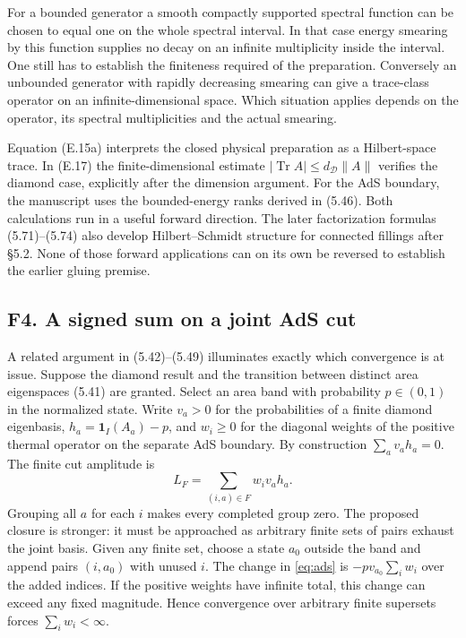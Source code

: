 \documentclass[11pt]{article}
\newcommand{\Tr}{\operatorname{Tr}}
\newcommand{\id}{\mathbf{1}}
\begin{document}
For a bounded generator a smooth compactly supported spectral function can be chosen to equal one on the whole spectral interval. In that case energy smearing by this function supplies no decay on an infinite multiplicity inside the interval. One still has to establish the finiteness required of the preparation. Conversely an unbounded generator with rapidly decreasing smearing can give a trace-class operator on an infinite-dimensional space. Which situation applies depends on the operator, its spectral multiplicities and the actual smearing.

Equation (E.15a) interprets the closed physical preparation as a Hilbert-space trace. In (E.17) the finite-dimensional estimate $|\Tr A|\le d_{\mathcal D}\|A\|$ verifies the diamond case, explicitly after the dimension argument. For the AdS boundary, the manuscript uses the bounded-energy ranks derived in (5.46). Both calculations run in a useful forward direction. The later factorization formulas (5.71)--(5.74) also develop Hilbert--Schmidt structure for connected fillings after \S5.2. None of those forward applications can on its own be reversed to establish the earlier gluing premise.

\subsection{F4. A signed sum on a joint AdS cut}
A related argument in (5.42)--(5.49) illuminates exactly which convergence is at issue. Suppose the diamond result and the transition between distinct area eigenspaces (5.41) are granted. Select an area band with probability $p\in(0,1)$ in the normalized state. Write $v_a>0$ for the probabilities of a finite diamond eigenbasis, $h_a=\id_I(A_a)-p$, and $w_i\ge0$ for the diagonal weights of the positive thermal operator on the separate AdS boundary. By construction $\sum_a v_a h_a=0$. The finite cut amplitude is
\begin{equation}\label{eq:ads}
 L_F=\sum_{(i,a)\in F} w_i v_a h_a .
\end{equation}
Grouping all $a$ for each $i$ makes every completed group zero. The proposed closure is stronger: it must be approached as arbitrary finite sets of pairs exhaust the joint basis. Given any finite set, choose a state $a_0$ outside the band and append pairs $(i,a_0)$ with unused $i$. The change in \eqref{eq:ads} is $-p v_{a_0}\sum_i w_i$ over the added indices. If the positive weights have infinite total, this change can exceed any fixed magnitude. Hence convergence over arbitrary finite supersets forces $\sum_i w_i<\infty$.
\end{document}
